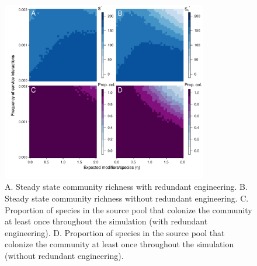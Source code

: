 \documentclass[9pt,twocolumn,twoside]{pnas-new}
\begin{document}
\begin{figure}[h!]
\centering
\includegraphics[width=0.8\textwidth]{fig_steadystates2.pdf}
\caption{
A. Steady state community richness with redundant engineering.
B. Steady state community richness without redundant engineering.
C. Proportion of species in the source pool that colonize the community at least once throughout the simulation (with redundant engineering).
D. Proportion of species in the source pool that colonize the community at least once throughout the simulation (without redundant engineering).
}
\label{fig:steadystate}
\end{figure}
\end{document}
